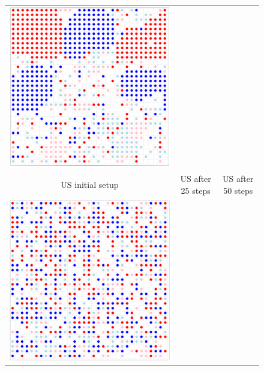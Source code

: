 \documentclass[12pt, a4paper]{article}
\begin{document}
\begin{figure}[H]
\begin{tabular}{ccc}
			\includegraphics[scale=0.35]{Plots/UK_step50.PNG} \\
			US initial setup & US after 25 steps & US after 50 steps \\
			\includegraphics[scale=0.35]{Plots/US_step0.PNG} &  

\end{tabular}
\end{figure}
\end{document}

